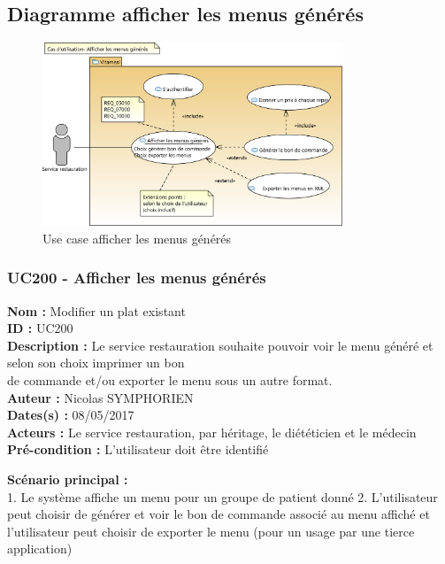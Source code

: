 \subsection{Diagramme afficher les menus
générés}\label{diagramme-afficher-les-menus-guxe9nuxe9ruxe9s}

\begin{figure}
\centering
\includegraphics[width=0.8\textwidth]{../../CasDUtilisations/AfficherMenu/uc_afficher_menu.png}
\caption{Use case afficher les menus générés}
\end{figure}

\subsubsection{UC200 - Afficher les menus
générés}\label{uc200---afficher-les-menus-guxe9nuxe9ruxe9s}

\noindent\textbf{Nom :} Modifier un plat existant\\
\textbf{ID :} UC200\\
\textbf{Description :} Le service restauration souhaite pouvoir voir le
menu généré et selon son choix imprimer un bon\\
de commande et/ou exporter le menu sous un autre format.\\
\textbf{Auteur :} Nicolas SYMPHORIEN\\
\textbf{Dates(s) :} 08/05/2017\\
\textbf{Acteurs :} Le service restauration, par héritage, le diététicien
et le médecin\\
\textbf{Pré-condition :} L'utilisateur doit être identifié

\textbf{Scénario principal :}\\
1. Le système affiche un menu pour un groupe de patient donné 2.
L'utilisateur peut choisir de générer et voir le bon de commande associé
au menu affiché et l'utilisateur peut choisir de exporter le menu (pour
un usage par une tierce application)

